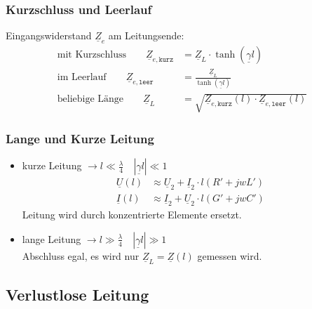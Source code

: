 \subsubsection{Kurzschluss und Leerlauf}
Eingangswiderstand $ \underline{Z}_e $ am Leitungsende:
\begin{align*}
	\text{mit Kurzschluss} \qquad \underline{Z}_{e,\texttt{kurz}} & = \underline{Z}_L \cdot \tanh(\underline{\gamma}l)                                 \\
	\text{im Leerlauf} \qquad
	\underline{Z}_{e,\texttt{leer}}                               & = \tfrac{\underline{Z}_L}{\tanh(\underline{\gamma}l)}                              \\
	\text{beliebige Länge} \qquad \underline{Z}_L                 & =\sqrt{\underline{Z}_{e,\texttt{kurz}}(l)\cdot \underline{Z}_{e,\texttt{leer}}(l)}
\end{align*}

\subsubsection{Lange und Kurze Leitung}
\begin{itemize}
	\item kurze Leitung $\rightarrow l \ll \tfrac{\lambda}{4} \quad |\underline{\gamma}l| \ll 1 $
	      \begin{align*}
		      \underline{U}(l) & \approx \underline{U}_2 + \underline{I}_2 \cdot l (R' + jwL') \\
		      \underline{I}(l) & \approx \underline{I}_2 + \underline{U}_2 \cdot l (G'+jwC')
	      \end{align*}
	      Leitung wird durch konzentrierte Elemente ersetzt.

	\item lange Leitung $\rightarrow l \gg \tfrac{\lambda}{4} \quad |\underline{\gamma}l| \gg 1$\\
	      Abschluss egal, es wird nur $ \underline{Z}_L = \underline{Z}(l) $ gemessen wird.
\end{itemize}

\subsection{Verlustlose Leitung}

